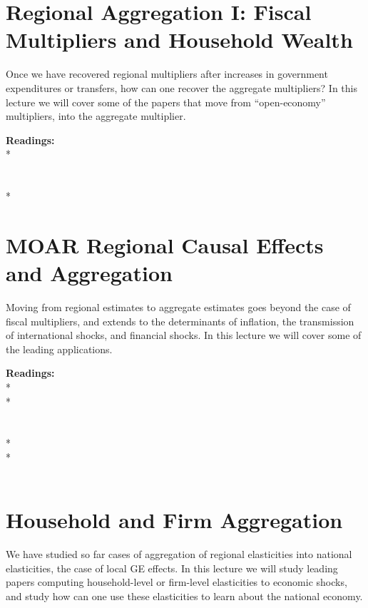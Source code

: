 \documentclass [12pt]{article}
\begin{document}
\section{Regional Aggregation I: Fiscal Multipliers and Household Wealth}

Once we have recovered regional multipliers after increases in government expenditures or transfers, how can one recover the aggregate multipliers? In this lecture we will cover some of the papers that move from ``open-economy'' multipliers, into the aggregate multiplier.

\noindent\textbf{Readings:}\\
*
\\
 \\
\\
*\\


\section{MOAR Regional Causal Effects and Aggregation}

Moving from regional estimates to aggregate estimates goes beyond the case of fiscal multipliers, and extends to the determinants of inflation, the transmission of international shocks, and financial shocks. In this lecture we will cover some of the leading applications.

\noindent\textbf{Readings:}\\
*\\
*\\
\\
\\
*\\
*\\
\\

\section{Household and Firm Aggregation}


We have studied so far cases of aggregation of regional elasticities into national elasticities, the case of local GE effects. In this lecture we will study leading papers computing household-level or firm-level elasticities to economic shocks, and study how can one use these elasticities to learn about the national economy.
\end{document}
